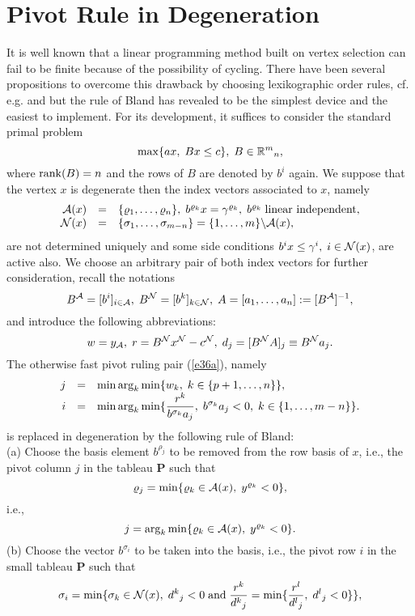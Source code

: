\section{Pivot Rule in Degeneration}
It is well known that a linear programming method built on vertex selection can
fail to be finite because of the possibility of cycling.  There have been
several propositions to overcome this drawback by choosing lexikographic order
rules, cf.  e.g.  \cite{Dan} and \cite{AzDi} but the rule of {\sc Bland}
\cite{Bla} has revealed to be the simplest device and the easiest to implement.
For its development, it suffices to consider the standard primal problem
%
\[
\max \{ax, \; Bx \leq c \}, \; B \in \Bbb{R}^m{}_n,
\]
where $\rank (B) = n$ and the rows of $B$ are denoted by $b^i$ again.  We
suppose that the vertex $x$ is degenerate then the index vectors associated to
$x$, namely
\[
\ba{.}{rcl}
\A(x) &=& \{\rho _1, \ldots, \rho _n\}, \; b^{\rho _k}x =
\gamma ^{\rho _k}, \; b^{\rho _k} \; \mbox{linear independent},\\
\N(x) &=& \{\sigma _1,\ldots,\sigma _{m-n}\} = \{1, \ldots, m\} \backslash
\A(x),
\ea{.}
\]
are not determined uniquely and some side conditions $b^ix \leq \gamma ^i,
\; i \in \N(x)$, are active also.  We choose an arbitrary pair of both index
vectors for further consideration, recall the notations
\[
B^{\A} = [b^i]_{i\in \A}, \; B^{\N} = [b^k]_{k \in \N}, \;
A =[a_1, \ldots, a_n] := [B^{\A}]^{-1},
\]
and introduce the following abbreviations:
\[
w = y_{\A}, \; r = B^{\N}x^{\N} - c^{\N}, \; d_j = [B^{\N}A]_j \equiv
B^{\N}a_j. \]
The otherwise fast pivot ruling pair (\ref{e36a}), namely
\[
\ba{.}{rcl}
j &=& \min \arg_k \min \{w_k, \; k \in \{p+1, \ldots, n\}\},\\
i &=& \dis \min \arg_k \min \{\frac{r^k}
{b^{\sigma _k}a_j}, \; b^{\sigma _k}a_j < 0, \; k \in \{1, \ldots, m -n \}\}.
\ea{.}
\]
is replaced in degeneration by the following rule of {\sc Bland}:\\
(a) Choose the basis element $b^{\rho _j}$ to be removed from the row basis of
$x$, i.e., the pivot column $j$ in the tableau {\bf P} such that
%
\[
  \rho _j = \min\{\rho _k \in \A(x), \; y^{\rho _k} < 0\},
\]
i.e.,
\begin{equation} \label{bl1}
      j = \arg_k\min\{\rho _k \in \A(x), \; y^{\rho _k} < 0\}.
\end{equation}
(b) Choose the vector $b^{\sigma _i}$ to be taken into the basis, i.e., the
pivot row $i$ in the small tableau {\bf P} such that
%
\[
\sigma _i = \dis\min\{\sigma _k \in \N(x), \;
d^k{}_j < 0 \; \mbox{and} \; \frac{r^k}{d^k{}_j} = \min\{\frac{r^l}{d^l{}_j},
\; d^l{}_j < 0\}\},
\]

